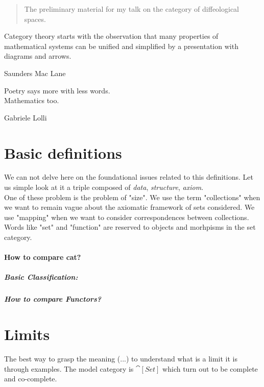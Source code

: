 \documentclass[a4paper,12pt,fleqn]{scrartcl}  %
\begin{document}
 
\begin{abstract}
	The preliminary material for my talk on the category of diffeological spaces.
\end{abstract}


\begin{appendices}
\epigraph{Category theory starts with the observation that many properties of mathematical systems can be unified and simplified by a presentation with diagrams and arrows.}{Saunders Mac Lane}
\epigraph{Poetry says more with less words.\\
Mathematics too.}{Gabriele Lolli}

\section{Basic definitions}
	
We can not delve here on the foundational issues related to this definitions. Let us simple look at it a triple composed of \emph{data}, \emph{structure}, \emph{axiom}.
\\
One of these problem is the problem of "size". We use the term "collections" when we want to remain vague about the axiomatic framework of sets considered.
We use "mapping" when we want to consider correspondences between collections.
\\
Words like "set" and "function" are reserved to objects and morhpisms in the set category.


\paragraph{How to compare cat?}
	

	\subparagraph{Basic Classification:}
	

\subparagraph{How to compare Functors?}
	

\newpage
\section{Limits}
	
	The best way to grasp the meaning (...) to understand what is a limit it is through examples. The model category is $\cat[Set]$ which turn out to be complete and co-complete.
	


\end{appendices}
\end{document}
